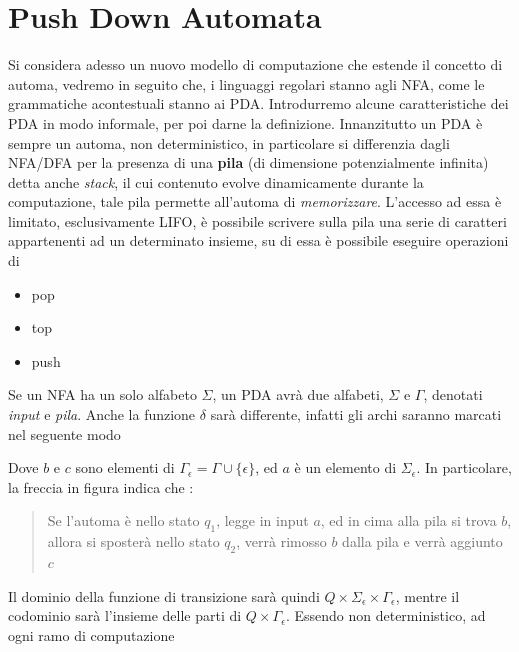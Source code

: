 \documentclass[10pt, letterpaper]{report}
\begin{document}
\section{Push Down Automata}
Si considera adesso un nuovo modello di computazione che estende il concetto di automa, vedremo in seguito 
che, i linguaggi regolari stanno agli NFA, come le grammatiche acontestuali stanno ai PDA. Introdurremo alcune 
caratteristiche dei PDA in modo informale, per poi darne la definizione.\acc 
Innanzitutto un PDA è sempre un automa, non deterministico, in particolare si differenzia dagli NFA/DFA per la 
presenza di una \textbf{pila} (di dimensione potenzialmente infinita) detta anche \textit{stack}, il cui contenuto evolve dinamicamente 
durante la computazione, tale pila permette all'automa di \textit{memorizzare}. L'accesso ad essa è limitato, 
esclusivamente LIFO, è possibile scrivere sulla pila una serie di caratteri appartenenti ad un determinato insieme, 
su di essa è possibile eseguire operazioni di \begin{itemize}
    \item pop 
    \item top 
    \item push
\end{itemize}
Se un NFA ha un solo alfabeto $\Sigma$, un PDA avrà due alfabeti, $\Sigma$ e $\Gamma$, denotati \textit{input} e 
\textit{pila}. Anche la funzione $\delta$ sarà differente, infatti gli archi saranno marcati nel seguente modo 
\begin{center}
\end{center} 
Dove $b$ e $c$ sono elementi di $\Gamma_{\epsilon}=\Gamma\cup\{\epsilon\}$, ed $a$ è un elemento di $\Sigma_{\epsilon}$.
In particolare, la freccia in figura indica che : \begin{quote}
    Se l'automa è nello stato $q_1$, legge in input $a$, ed in cima alla pila 
    si trova $b$, allora si sposterà nello stato $q_2$, verrà rimosso $b$ dalla pila 
    e verrà aggiunto $c$
\end{quote}
Il dominio della funzione di transizione sarà quindi $Q\times\Sigma_\epsilon\times \Gamma_\epsilon$, mentre il codominio 
sarà l'insieme delle parti di $Q\times\Gamma_\epsilon$. Essendo non deterministico, ad ogni ramo di computazione 
\end{document}
